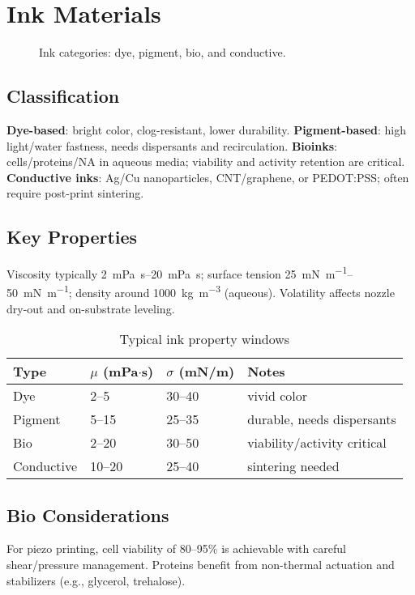 \documentclass[conference]{IEEEtran}
\begin{document}
\section{Ink Materials}

\begin{figure}[!t]
  \centering
  
  \caption{Ink categories: dye, pigment, bio, and conductive.}
  \label{fig:ink_classes}
\end{figure}

\subsection{Classification}
\textbf{Dye-based}: bright color, clog-resistant, lower durability. 
\textbf{Pigment-based}: high light/water fastness, needs dispersants and recirculation. 
\textbf{Bioinks}: cells/proteins/NA in aqueous media; viability and activity retention are critical. 
\textbf{Conductive inks}: Ag/Cu nanoparticles, CNT/graphene, or PEDOT:PSS; often require post-print sintering.

\subsection{Key Properties}
Viscosity typically \SIrange{2}{20}{\milli\pascal\second}; surface tension \SIrange{25}{50}{\milli\newton\per\meter}; density around \SI{1000}{\kilogram\per\cubic\meter} (aqueous). Volatility affects nozzle dry-out and on-substrate leveling.

\begin{table}[!t]
\caption{Typical ink property windows}
\label{tab:inks}
\centering\footnotesize
\begin{tabular*}{\columnwidth}{@{\extracolsep{\fill}}llll@{}}
\toprule
Type & $\mu$ (mPa$\cdot$s) & $\sigma$ (mN/m) & Notes \\
\midrule
Dye        & 2--5   & 30--40 & vivid color \\
Pigment    & 5--15  & 25--35 & durable, needs dispersants \\
Bio        & 2--20  & 30--50 & viability/activity critical \\
Conductive & 10--20 & 25--40 & sintering needed \\
\bottomrule
\end{tabular*}
\end{table}

\subsection{Bio Considerations}
For piezo printing, cell viability of 80--95\% is achievable with careful shear/pressure management. Proteins benefit from non-thermal actuation and stabilizers (e.g., glycerol, trehalose).
\end{document}
